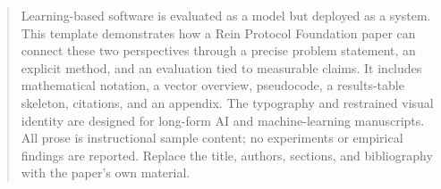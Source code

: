 \begin{abstract}
Learning-based software is evaluated as a model but deployed as a system.
This template demonstrates how a Rein Protocol Foundation paper can connect these two
perspectives through a precise problem statement, an explicit method, and
an evaluation tied to measurable claims. It includes mathematical notation,
a vector overview, pseudocode, a results-table skeleton, citations, and an
appendix. The typography and restrained visual identity are designed for
long-form AI and machine-learning manuscripts. All prose is instructional
sample content; no experiments or empirical findings are reported. Replace
the title, authors, sections, and bibliography with the paper's own material.
\end{abstract}

